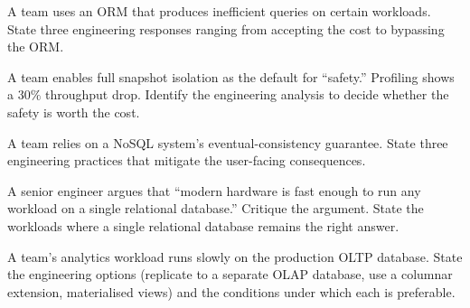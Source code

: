 \begin{exercise}
A team uses an ORM that produces inefficient queries on certain workloads. State three engineering responses ranging from accepting the cost to bypassing the ORM.
\end{exercise}

\begin{exercise}
A team enables full snapshot isolation as the default for ``safety.'' Profiling shows a $30\%$ throughput drop. Identify the engineering analysis to decide whether the safety is worth the cost.
\end{exercise}

\begin{exercise}
A team relies on a NoSQL system's eventual-consistency guarantee. State three engineering practices that mitigate the user-facing consequences.
\end{exercise}

\begin{exercise}
A senior engineer argues that ``modern hardware is fast enough to run any workload on a single relational database.'' Critique the argument. State the workloads where a single relational database remains the right answer.
\end{exercise}

\begin{exercise}
A team's analytics workload runs slowly on the production OLTP database. State the engineering options (replicate to a separate OLAP database, use a columnar extension, materialised views) and the conditions under which each is preferable.
\end{exercise}
